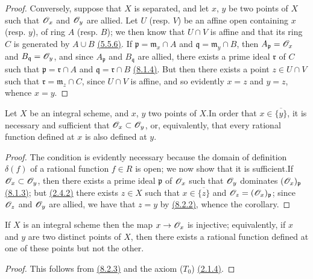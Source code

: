 \begin{proof}
Conversely, suppose that $X$ is separated, and let $x$, $y$ be two points of $X$
such that $\mathscr{O}_x$ and $\mathscr{O}_y$ are allied. Let $U$ (resp. $V$) be an affine open
containing $x$ (resp. $y$), of ring $A$ (resp. $B$); we then know that $U\cap V$
is affine and that its ring $C$ is generated by $A\cup B$ \hyperref[env-1.5.5.6]{(5.5.6)}. If
$\mathfrak{p}=\mathfrak{m}_x\cap A$ and $\mathfrak{q}=\mathfrak{m}_y\cap B$,
then $A_\mathfrak{p}=\mathscr{O}_x$ and $B_\mathfrak{q}=\mathscr{O}_y$, and since $A_\mathfrak{p}$
and $B_\mathfrak{q}$ are allied, there exists a prime ideal $\mathfrak{r}$ of
$C$ such that $\mathfrak{p}=\mathfrak{r}\cap A$ and
$\mathfrak{q}=\mathfrak{r}\cap B$ \hyperref[lem-1.8.1.4]{(8.1.4)}. But then there exists a point
$z\in U\cap V$ such that $\mathfrak{r}=\mathfrak{m}_z\cap C$, since $U\cap V$ is
affine, and so evidently $x=z$ and $y=z$, whence $x=y$.
\end{proof}

\begin{cor}[8.2.3]
\label{cor-1.8.2.3}
Let $X$ be an integral scheme, and $x$, $y$ two
points of $X$.In order that $x\in\overline{\{y\}}$, it is necessary and
sufficient that $\mathscr{O}_x\subset\mathscr{O}_y$, or, equivalently, that every rational
function defined at $x$ is also defined at $y$.
\end{cor}

\begin{proof}
\label{proof-cor-1.8.2.3}
The condition is evidently necessary because the domain of definition
$\delta(f)$ of a rational function $f\in R$ is open; we now show that it is
sufficient.If $\mathscr{O}_x\subset\mathscr{O}_y$, then there exists a prime ideal
$\mathfrak{p}$ of $\mathscr{O}_x$ such that $\mathscr{O}_y$ dominates $(\mathscr{O}_x)_\mathfrak{p}$
\hyperref[lem-1.8.1.3]{(8.1.3)}; but \hyperref[prop-1.2.4.2]{(2.4.2)} there exists $z\in X$ such that
$x\in\overline{\{z\}}$ and $\mathscr{O}_z=(\mathscr{O}_x)_\mathfrak{p}$; since $\mathscr{O}_z$ and $\mathscr{O}_y$
are allied, we have that $z=y$ by \hyperref[prop-1.8.2.2]{(8.2.2)}, whence the corollary.
\end{proof}

\begin{cor}[8.2.4]
\label{cor-1.8.2.4}
If $X$ is an integral scheme then the map
$x\to\mathscr{O}_x$ is injective; equivalently, if $x$ and $y$ are two distinct points of
$X$, then there exists a rational function defined at one of these points but
not the other.
\end{cor}

\begin{proof}
\label{proof-cor-1.8.2.4}
This follows from \hyperref[cor-1.8.2.3]{(8.2.3)} and the axiom ($T_0$) \hyperref[prop-1.2.1.4]{(2.1.4)}.
\end{proof}

